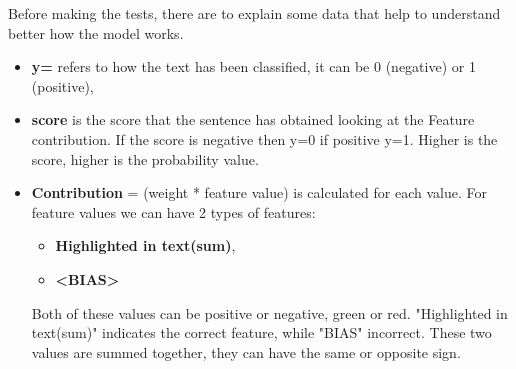 Before making the tests, there are to explain some data that help to understand better how the model works.
\begin{itemize}
    \item \textbf{y=} refers to how the text has been classified, it can be 0 (negative) or 1 (positive),
    \item \textbf{score} is the score that the sentence has obtained looking at the Feature contribution. If the score is negative then y=0 if positive y=1. Higher is the score, higher is the probability value.
    \item \textbf{Contribution} = (weight * feature value) is calculated for each value. For feature values we can have 2 types of features:
    \begin{itemize}
        \item \textbf{Highlighted in text(sum)},
        \item \textbf{<BIAS>}
    \end{itemize}
    Both of these values can be positive or negative, green or red.
    "Highlighted in text(sum)" indicates the correct feature, while "BIAS" incorrect. These two values are summed together, they can have the same or opposite sign.
\end{itemize}


